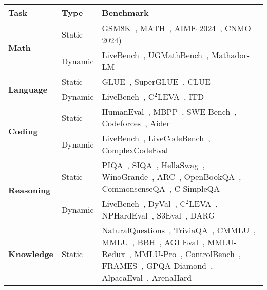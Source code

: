 \begin{table*}[t!]
    \centering
    \small
    \begin{tabularx}{\textwidth}{llX}
    \toprule
    \toprule
    \textbf{Task} & \textbf{Type} & \textbf{Benchmark} \\
    \midrule
    \multirow{2}[2]{*}{\textbf{Math}} & Static & GSM8K~\citep{cobbe2021training}, MATH~\citep{hendrycks2021measuring}, AIME 2024~\citep{maa2024aime}, CNMO 2024)~\citep{cnmo2024} \\
          & Dynamic & LiveBench~\citep{white2024livebench}, UGMathBench~\citep{xu2025ugmathbench}, Mathador-LM~\citep{kurtic-etal-2024-mathador} \\
    \midrule
    \multirow{2}[2]{*}{\textbf{Language}} & Static & GLUE~\citep{wang2018glue}, SuperGLUE~\citep{wang2019superglue}, CLUE~\citep{xu2020clue} \\
          & Dynamic & LiveBench~\citep{white2024livebench}, C$^2$LEVA~\citep{li2024c}, ITD~\citep{zhu-etal-2024-inference} \\
    \midrule
    \multirow{2}[2]{*}{\textbf{Coding}} & Static & HumanEval~\citep{chen2021evaluating}, MBPP~\citep{austin2021program}, SWE-Bench~\citep{jimenez2024swebench,yang2024swebenchmultimodal}, Codeforces~\citep{codeforces}, Aider~\citep{aider} \\
          & Dynamic & LiveBench~\citep{white2024livebench}, LiveCodeBench~\citep{jain2024livecodebenchholisticcontaminationfree}, ComplexCodeEval~\citep{10.1145/3691620.3695552} \\
    \midrule
    \multirow{2}[2]{*}{\textbf{Reasoning}} & Static & PIQA~\citep{bisk2020piqa}, SIQA~\citep{sap2019socialiqa}, HellaSwag~\citep{zellers2019hellaswag}, WinoGrande~\citep{sakaguchi2021winogrande}, ARC~\citep{clark2018think}, OpenBookQA~\citep{mihaylov2018can}, CommonsenseQA~\citep{talmor2018commonsenseqa}, C-SimpleQA~\citep{he2024chinese} \\
          & Dynamic & LiveBench~\citep{white2024livebench}, DyVal~\citep{zhu2024dyval}, C$^2$LEVA~\citep{li2024c}, NPHardEval~\citep{fan-etal-2024-nphardeval}, S3Eval~\citep{lei-etal-2024-s3eval}, DARG~\citep{zhang2024darg} \\
    \midrule
    \multirow{2}[2]{*}{\textbf{Knowledge}} & Static & NaturalQuestions~\citep{kwiatkowski2019natural}, TriviaQA~\citep{joshi2017triviaqa}, CMMLU~\citep{li2023cmmlu}, MMLU~\citep{hendrycks2020measuring}, BBH~\citep{suzgun2022challenging}, AGI Eval~\citep{zhong2023agieval}, MMLU-Redux~\citep{gema2024we}, MMLU-Pro~\citep{wang2024mmlu}, ControlBench~\citep{Darioush2024ControlBench}, FRAMES~\citep{krishna2024fact}, GPQA Diamond~\citep{rein2023gpqagraduatelevelgoogleproofqa}, AlpacaEval~\citep{alpaca_eval}, ArenaHard~\citep{arenahard2024} \\

\end{tabularx}
\end{table*}
